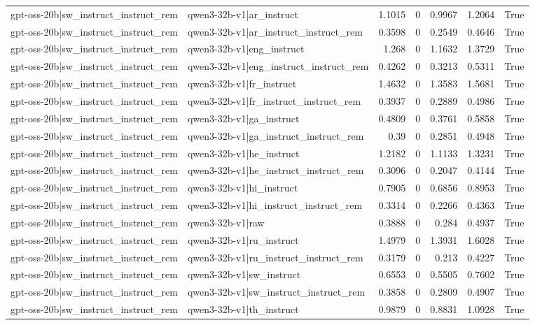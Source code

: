 \begin{table}
\begin{tabular}{l l r r r r l}
gpt-oss-20b|sw_instruct_instruct_rem & qwen3-32b-v1|ar_instruct & 1.1015 & 0 & 0.9967 & 1.2064 & True \\
gpt-oss-20b|sw_instruct_instruct_rem & qwen3-32b-v1|ar_instruct_instruct_rem & 0.3598 & 0 & 0.2549 & 0.4646 & True \\
gpt-oss-20b|sw_instruct_instruct_rem & qwen3-32b-v1|eng_instruct & 1.268 & 0 & 1.1632 & 1.3729 & True \\
gpt-oss-20b|sw_instruct_instruct_rem & qwen3-32b-v1|eng_instruct_instruct_rem & 0.4262 & 0 & 0.3213 & 0.5311 & True \\
gpt-oss-20b|sw_instruct_instruct_rem & qwen3-32b-v1|fr_instruct & 1.4632 & 0 & 1.3583 & 1.5681 & True \\
gpt-oss-20b|sw_instruct_instruct_rem & qwen3-32b-v1|fr_instruct_instruct_rem & 0.3937 & 0 & 0.2889 & 0.4986 & True \\
gpt-oss-20b|sw_instruct_instruct_rem & qwen3-32b-v1|ga_instruct & 0.4809 & 0 & 0.3761 & 0.5858 & True \\
gpt-oss-20b|sw_instruct_instruct_rem & qwen3-32b-v1|ga_instruct_instruct_rem & 0.39 & 0 & 0.2851 & 0.4948 & True \\
gpt-oss-20b|sw_instruct_instruct_rem & qwen3-32b-v1|he_instruct & 1.2182 & 0 & 1.1133 & 1.3231 & True \\
gpt-oss-20b|sw_instruct_instruct_rem & qwen3-32b-v1|he_instruct_instruct_rem & 0.3096 & 0 & 0.2047 & 0.4144 & True \\
gpt-oss-20b|sw_instruct_instruct_rem & qwen3-32b-v1|hi_instruct & 0.7905 & 0 & 0.6856 & 0.8953 & True \\
gpt-oss-20b|sw_instruct_instruct_rem & qwen3-32b-v1|hi_instruct_instruct_rem & 0.3314 & 0 & 0.2266 & 0.4363 & True \\
gpt-oss-20b|sw_instruct_instruct_rem & qwen3-32b-v1|raw & 0.3888 & 0 & 0.284 & 0.4937 & True \\
gpt-oss-20b|sw_instruct_instruct_rem & qwen3-32b-v1|ru_instruct & 1.4979 & 0 & 1.3931 & 1.6028 & True \\
gpt-oss-20b|sw_instruct_instruct_rem & qwen3-32b-v1|ru_instruct_instruct_rem & 0.3179 & 0 & 0.213 & 0.4227 & True \\
gpt-oss-20b|sw_instruct_instruct_rem & qwen3-32b-v1|sw_instruct & 0.6553 & 0 & 0.5505 & 0.7602 & True \\
gpt-oss-20b|sw_instruct_instruct_rem & qwen3-32b-v1|sw_instruct_instruct_rem & 0.3858 & 0 & 0.2809 & 0.4907 & True \\
gpt-oss-20b|sw_instruct_instruct_rem & qwen3-32b-v1|th_instruct & 0.9879 & 0 & 0.8831 & 1.0928 & True \\

\end{tabular}
\end{table}
